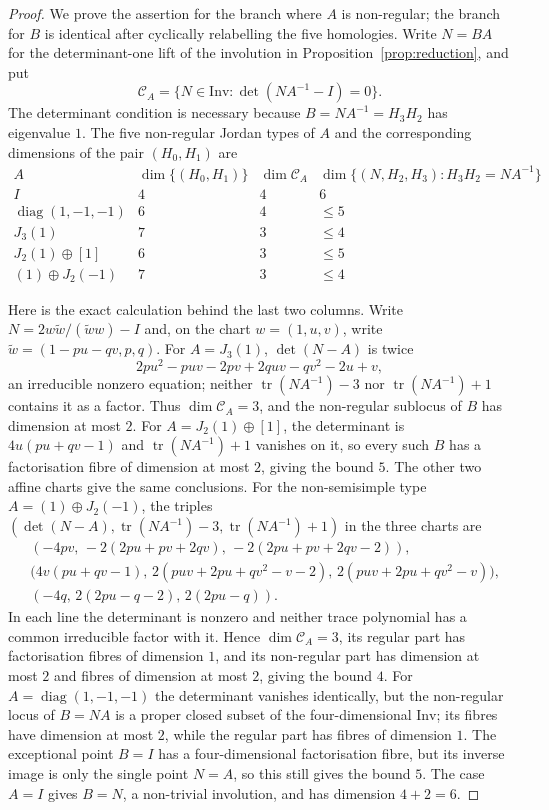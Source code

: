 \documentclass[11pt,a4paper]{article}
\theoremstyle{plain}
\theoremstyle{definition}
\theoremstyle{remark}
\newcommand{\tr}{\operatorname{tr}}
\begin{document}
\begin{proof}
We prove the assertion for the branch where $A$ is non-regular; the branch for $B$
is identical after cyclically relabelling the five homologies. Write $N=BA$ for the
determinant-one lift of the involution in Proposition~\ref{prop:reduction}, and put
\[
 \mathcal C_A=\{N\in\mathrm{Inv}:\det(NA^{-1}-I)=0\}.
\]
The determinant condition is necessary because $B=NA^{-1}=H_3H_2$ has eigenvalue
$1$. The five non-regular Jordan types of $A$ and the corresponding dimensions of
the pair $(H_0,H_1)$ are
\[
\begin{array}{c|c|c|c}
 A&\dim\{(H_0,H_1)\}&\dim\mathcal C_A&
 \dim\{(N,H_2,H_3):H_3H_2=NA^{-1}\}\\ \hline
 I&4&4&6\\
 \operatorname{diag}(1,-1,-1)&6&4&\le5\\
 J_3(1)&7&3&\le4\\
 J_2(1)\oplus[1]&6&3&\le5\\
 (1)\oplus J_2(-1)&7&3&\le4
\end{array}
\]

Here is the exact calculation behind the last two columns. Write
$N=2w\tilde w/(\tilde ww)-I$ and, on the chart $w=(1,u,v)$, write
$\tilde w=(1-pu-qv,p,q)$. For $A=J_3(1)$,
$\det(N-A)$ is twice
\[
 2pu^2-puv-2pv+2quv-qv^2-2u+v,
\]
an irreducible nonzero equation; neither $\tr(NA^{-1})-3$ nor
$\tr(NA^{-1})+1$ contains it as a factor. Thus $\dim\mathcal C_A=3$, and the
non-regular sublocus of $B$ has dimension at most $2$. For $A=J_2(1)\oplus[1]$,
the determinant is $4u(pu+qv-1)$ and $\tr(NA^{-1})+1$ vanishes on it, so every
such $B$ has a factorisation fibre of dimension at most $2$, giving the bound $5$.
The other two affine charts give the same conclusions. For the non-semisimple type
$A=(1)\oplus J_2(-1)$, the triples
$(\det(N-A),\tr(NA^{-1})-3,\tr(NA^{-1})+1)$ in the three charts are
\[
\begin{aligned}
&(-4pv,\,-2(2pu+pv+2qv),\,-2(2pu+pv+2qv-2)),\\
&\bigl(4v(pu+qv-1),\,2(puv+2pu+qv^2-v-2),\,2(puv+2pu+qv^2-v)\bigr),\\
&(-4q,\,2(2pu-q-2),\,2(2pu-q)).
\end{aligned}
\]
In each line the determinant is nonzero and neither trace polynomial has a
common irreducible factor with it. Hence
$\dim\mathcal C_A=3$, its regular part has factorisation fibres of dimension $1$,
and its non-regular part has dimension at most $2$ and fibres of dimension at most
$2$, giving the bound $4$. For
$A=\operatorname{diag}(1,-1,-1)$ the determinant vanishes identically, but the
non-regular locus of $B=NA$ is a proper closed subset of the four-dimensional
$\mathrm{Inv}$; its fibres have dimension at most $2$, while the regular part has
fibres of dimension $1$. The exceptional point $B=I$ has a four-dimensional
factorisation fibre, but its inverse image is only the single point $N=A$, so this
still gives the bound $5$. The case $A=I$ gives $B=N$, a non-trivial involution, and
has dimension $4+2=6$.


\end{proof}
\end{document}
